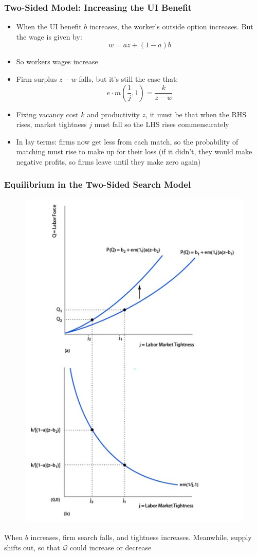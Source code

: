 \documentclass{beamer}
\begin{document}
\begin{frame}
\frametitle[alignment=center]{Two-Sided Model:  Increasing the UI Benefit}
\begin{itemize}
\item When the UI benefit $b$ increases, the worker's outside option increases.  But the wage is given by:
$$w=az+(1-a)b$$
\item So workers wages increase
\bigskip
\item Firm surplus $z-w$ falls, but it's still the case that:
$$e\cdot m\left(\frac{1}{j},1\right)=\frac{k}{z-w}$$
\item Fixing vacancy cost $k$ and productivity $z$, it must be that when the RHS rises, market tightness $j$ must fall so the LHS rises commensurately
\bigskip
\item In lay terms:  firms now get less from each match, so the probability of matching must rise to make up for their loss (if it didn't, they would make negative profits, so firms leave until they make zero again)
\end{itemize}
\end{frame}


\begin{frame}
\frametitle[alignment=center]{Equilibrium in the Two-Sided Search Model}
\begin{figure}
\centering
\includegraphics[scale=0.5]{Figures/W_Fig_6pt21.png}
\end{figure}
When $b$ increases, firm search falls, and tightness increases.  Meanwhile, supply shifts out, so that $\mathcal{Q}$ could increase or decrease 
\end{frame}
\end{document}
